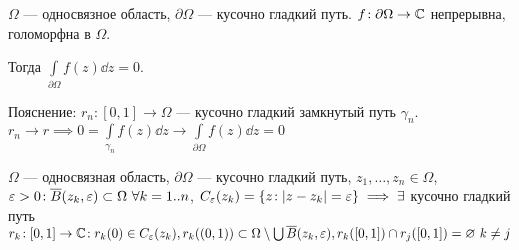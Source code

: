 \begin{definition}
    $\Omega$ --- односвязное область,  $\partial \Omega$ --- кусочно гладкий путь.  $f\!: \partial \Omega \to \mathbb{C}$ непрерывна, голоморфна в  $\Omega$.

    Тогда  $\int\limits_{\partial \Omega} f(z) \dd{z} = 0$.
\end{definition}

Пояснение: $r_n\!: [0, 1] \to \Omega$ --- кусочно гладкий замкнутый путь  $\gamma_n$.  $r_n \to r \implies 0 = \int\limits_{\gamma_n} f(z) \dd{z} \to \int\limits_{\partial \Omega}f(z) \dd{z} = 0$

\begin{definition}
    $\Omega$ --- односвязная область,  $\partial \Omega$ --- кусочно гладкий путь,  $z_1, \ldots, z_n \in \Omega$, $\varepsilon > 0\!: \overline{B}(z_k, \varepsilon) \subset \Omega\ \forall k=1..n$, $C_\varepsilon(z_k) = \left\{ z\!: |z-z_k| = \varepsilon \right\} \implies \exists$ кусочно гладкий путь $r_k\!:[0, 1] \to \mathbb{C}\!: r_k(0) \in C_\varepsilon(z_k), r_k((0, 1)) \subset \Omega \setminus \bigcup \overline{B}(z_k, \varepsilon), r_k([0, 1]) \cap r_j([0, 1]) = \varnothing\ k \neq j$
\end{definition}

